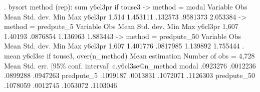 . bysort method (rep): sum y6cl3pr if touse3
{\smallskip}
-> method = modal
{\smallskip}
    Variable {\VBAR}        Obs        Mean    Std. dev.       Min        Max
     y6cl3pr {\VBAR}      1,514    1.453111     .132573   .9581373   2.053384
{\smallskip}
-> method = predpute_5
{\smallskip}
    Variable {\VBAR}        Obs        Mean    Std. dev.       Min        Max
     y6cl3pr {\VBAR}      1,607     1.40193    .0876854   1.136963   1.883443
{\smallskip}
-> method = predpute_50
{\smallskip}
    Variable {\VBAR}        Obs        Mean    Std. dev.       Min        Max
     y6cl3pr {\VBAR}      1,607    1.401776    .0817985   1.139892   1.755444
{\smallskip}
{\smallskip}
. mean y6cl3se if touse3, over(n_method)
{\smallskip}
Mean estimation                                Number of obs = 4,728
{\smallskip}
                   {\VBAR}       Mean   Std. err.     [95\% conf. interval]
c.y6cl3se@n_method {\VBAR}
            modal  {\VBAR}   .0923276   .0012236      .0899288    .0947263
       predpute_5  {\VBAR}   .1099187   .0013831      .1072071    .1126303
      predpute_50  {\VBAR}   .1078059   .0012745      .1053072    .1103046
